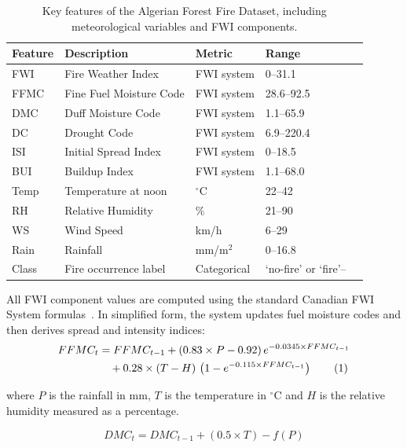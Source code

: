 \documentclass[11pt,a4paper]{report}
\begin{document}
\begin{table}[h!]
\centering
\caption{Key features of the Algerian Forest Fire Dataset, including meteorological variables and FWI components.}
\label{tab:algerian-features}
\small
\begin{tabular}{@{}llllp{2.4cm}@{}}
\toprule
Feature & Description & Metric & Range \\
\midrule
FWI   & Fire Weather Index               & FWI system  & 0--31.1    \\
FFMC  & Fine Fuel Moisture Code         & FWI system  & 28.6--92.5  \\
DMC   & Duff Moisture Code              & FWI system  & 1.1--65.9   \\
DC    & Drought Code                    & FWI system  & 6.9--220.4   \\
ISI   & Initial Spread Index            & FWI system  & 0--18.5     \\
BUI   & Buildup Index                   & FWI system  & 1.1--68.0   \\
Temp  & Temperature at noon             & $^\circ$C   & 22--42      \\
RH    & Relative Humidity               & \%          & 21--90      \\
WS    & Wind Speed                      & km/h        & 6--29       \\
Rain  & Rainfall                        & mm/m$^2$    & 0--16.8      \\
Class & Fire occurrence label           & Categorical & `no-fire' or `fire'--  \\
\bottomrule
\end{tabular}
\end{table}

All FWI component values are computed using the standard Canadian FWI System formulas~\cite{stocks1989}. In simplified form, the system updates fuel moisture codes and then derives spread and intensity indices:
\begin{align}
FFMC_t &= FFMC_{t-1}
        + (0.83 \times P - 0.92)\, e^{-0.0345 \times FFMC_{t-1}} \notag\\
      &\quad + 0.28 \times (T - H)\,\left(1 - e^{-0.115 \times FFMC_{t-1}}\right)
\tag{1}
\end{align}

where $P$ is the rainfall in mm, $T$ is the temperature in $^\circ$C and $H$ is the relative
humidity measured as a percentage.

\begin{equation}
DMC_t = DMC_{t-1} + (0.5 \times T) - f(P)
\tag{2}
\end{equation}
\end{document}

